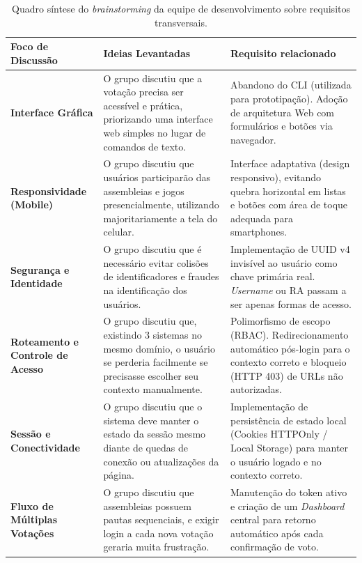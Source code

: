 \documentclass[12pt,a4paper]{article}
\begin{document}
\begin{table}[H]
    \centering
    \small
    \renewcommand{\arraystretch}{1.5}
    \begin{tabular}{|m{3.5cm}|m{6.5cm}|m{5cm}|}
        \hline
        \rowcolor[gray]{0.9}
        \textbf{Foco de Discussão} & \textbf{Ideias Levantadas} & \textbf{Requisito relacionado} \\
        \hline
        
        \textbf{Interface Gráfica} & 
        O grupo discutiu que a votação precisa ser acessível e prática, priorizando uma interface web simples no lugar de comandos de texto. & 
        Abandono do CLI (utilizada para prototipação). Adoção de arquitetura Web com formulários e botões via navegador. \\
        \hline

        \textbf{Responsividade (Mobile)} & 
        O grupo discutiu que usuários participarão das assembleias e jogos presencialmente, utilizando majoritariamente a tela do celular. & 
        Interface adaptativa (design responsivo), evitando quebra horizontal em listas e botões com área de toque adequada para smartphones. \\
        \hline
        
        \textbf{Segurança e Identidade} & 
        O grupo discutiu que é necessário evitar colisões de identificadores e fraudes na identificação dos usuários. & 
        Implementação de UUID v4 invisível ao usuário como chave primária real. \textit{Username} ou RA passam a ser apenas formas de acesso. \\
        \hline

        \textbf{Roteamento e Controle de Acesso} & 
        O grupo discutiu que, existindo 3 sistemas no mesmo domínio, o usuário se perderia facilmente se precisasse escolher seu contexto manualmente. & 
        Polimorfismo de escopo (RBAC). Redirecionamento automático pós-login para o contexto correto e bloqueio (HTTP 403) de URLs não autorizadas. \\
        \hline
        
        \textbf{Sessão e Conectividade} & 
        O grupo discutiu que o sistema deve manter o estado da sessão mesmo diante de quedas de conexão ou atualizações da página. & 
        Implementação de persistência de estado local (Cookies HTTPOnly / Local Storage) para manter o usuário logado e no contexto correto. \\
        \hline

        \textbf{Fluxo de Múltiplas Votações} & 
       O grupo discutiu que assembleias possuem pautas sequenciais, e exigir login a cada nova votação geraria muita frustração. & 
        Manutenção do token ativo e criação de um \textit{Dashboard} central para retorno automático após cada confirmação de voto. \\
        \hline
        
    \end{tabular}
    \caption{Quadro síntese do \textit{brainstorming} da equipe de desenvolvimento sobre requisitos transversais.}
    \label{tab:brainstorming}
\end{table}
\end{document}
